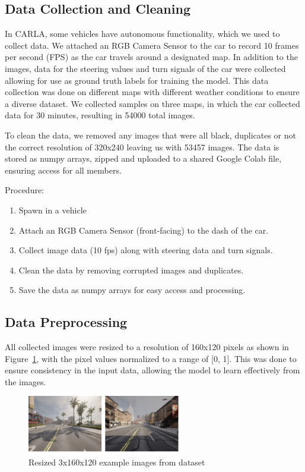 \documentclass{article} %
\begin{document}
\subsection{Data Collection and Cleaning}

In CARLA, some vehicles have autonomous functionality, which we used to collect data.
We attached an RGB Camera Sensor to the car to record 10 frames per second (FPS) as the car
travels around a designated map. In addition to the images, data for the steering values and turn signals of the car
were collected allowing for use as ground truth labels for training the model. This data collection was done on different maps with different weather conditions
to ensure a diverse dataset. We collected samples on three maps, in which the car collected data for 30 minutes, resulting in 54000 total images.


To clean the data, we removed any images that were all black, duplicates or not the correct resolution of 320x240 leaving us with 53457 images.  
The data is stored as numpy arrays, zipped and uploaded to a shared Google Colab file, ensuring access for all members. 

Procedure:
\begin{enumerate}
  \item{Spawn in a vehicle}
  \item{Attach an RGB Camera Sensor (front-facing) to the dash of the car.}
  \item{Collect image data (10 fps) along with steering data and turn signals.}
  \item {Clean the data by removing corrupted images and duplicates.}
  \item {Save the data as numpy arrays for easy access and processing.}
\end{enumerate}


\subsection{Data Preprocessing}
All collected images were resized to a resolution of 160x120 pixels as shown in Figure~\ref{fig:exampleofdataset}, with the pixel values normalized to a range of [0, 1]. 
This was done to ensure consistency in the input data, allowing the model to learn effectively from the images.

\begin{figure}[H] %
    \centering
    \includegraphics[width=0.6\textwidth]{exampleofdataset.png} %
    \caption{Resized 3x160x120 example images from dataset}
    \label{fig:exampleofdataset}
\end{figure}
\end{document}
